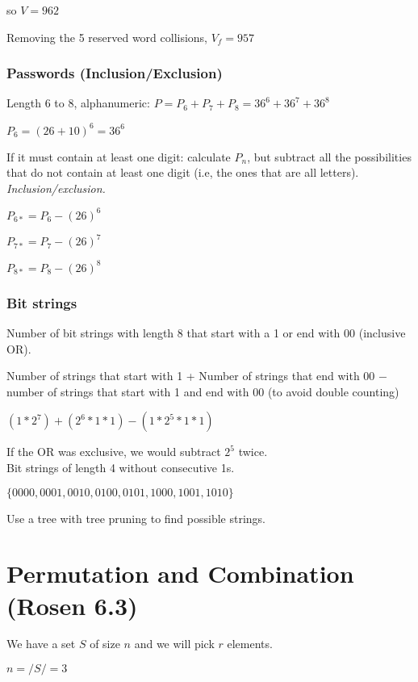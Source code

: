 \documentclass[english,openany]{book}
\begin{document}
    so $V = 962$

    Removing the 5 reserved word collisions, $V_f = 957$\\

    \subsubsection{Passwords (Inclusion/Exclusion)}

    Length 6 to 8, alphanumeric: $P = P_6 + P_7 + P_8 = 36^6 + 36^7 + 36^8$

    $P_6 = (26+10)^6 = 36^6$

    If it must contain at least one digit: calculate $P_n$, but subtract all the possibilities that do not contain at least one digit (i.e, the ones that are all letters). \textit{Inclusion/exclusion.}

    $P_{6*} = P_6 - (26)^6$

    $P_{7*} = P_7 - (26)^7$

    $P_{8*} = P_8 - (26)^8$\\

    \subsubsection{Bit strings}

    Number of bit strings with length 8 that start with a 1 or end with 00 (inclusive OR).

    Number of strings that start with 1 + Number of strings that end with 00 $-$ number of strings that start with 1 and end with 00 (to avoid double counting)

    $(1 * 2^7) + (2^6 * 1 * 1) - (1 * 2^5 * 1 * 1)$

    If the OR was exclusive, we would subtract $2^5$ twice.\\

    Bit strings of length 4 without consecutive 1s.

    $\{0000, 0001, 0010, 0100, 0101, 1000, 1001, 1010\}$

    Use a tree with tree pruning to find possible strings.

    \newpage
    \section{Permutation and Combination (Rosen 6.3)}

    We have a set $S$ of size $n$ and we will pick $r$ elements.

    $n = /S/ = 3$
\end{document}
